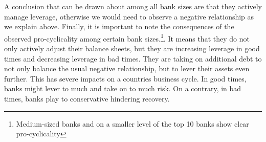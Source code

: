 \documentclass[12pt, a4paper]{article} %
\begin{document}
A conclusion that can be drawn about among all bank sizes are that they actively manage leverage, otherwise we would need to observe a negative relationship as we explain above.
Finally, it is important to note the consequences of the observed pro-cyclicality among certain bank sizes.\footnote{Medium-sized banks and on a smaller level of the top 10 banks show clear pro-cyclicality}. It means that they do not only actively adjust their balance sheets, but they are increasing leverage in good times and decreasing leverage in bad times. They are taking on additional debt to not only balance the usual negative relationship, but to lever their assets even further. This has severe impacts on a countries business cycle. In good times, banks might lever to much and take on to much risk. On a contrary, in bad times, banks play to conservative hindering recovery. 



\end{document}
